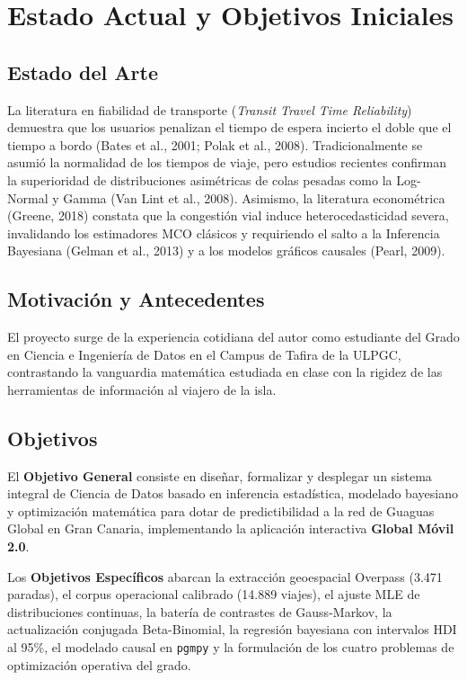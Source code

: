 \documentclass[11pt,a4paper,twoside]{report}
\begin{document}
\chapter{Estado Actual y Objetivos Iniciales}

\section{Estado del Arte}
La literatura en fiabilidad de transporte (\textit{Transit Travel Time Reliability}) demuestra que los usuarios penalizan el tiempo de espera incierto el doble que el tiempo a bordo (Bates et al., 2001; Polak et al., 2008). Tradicionalmente se asumió la normalidad de los tiempos de viaje, pero estudios recientes confirman la superioridad de distribuciones asimétricas de colas pesadas como la Log-Normal y Gamma (Van Lint et al., 2008). Asimismo, la literatura econométrica (Greene, 2018) constata que la congestión vial induce heterocedasticidad severa, invalidando los estimadores MCO clásicos y requiriendo el salto a la Inferencia Bayesiana (Gelman et al., 2013) y a los modelos gráficos causales (Pearl, 2009).

\section{Motivación y Antecedentes}
El proyecto surge de la experiencia cotidiana del autor como estudiante del Grado en Ciencia e Ingeniería de Datos en el Campus de Tafira de la ULPGC, contrastando la vanguardia matemática estudiada en clase con la rigidez de las herramientas de información al viajero de la isla.

\section{Objetivos}
El \textbf{Objetivo General} consiste en diseñar, formalizar y desplegar un sistema integral de Ciencia de Datos basado en inferencia estadística, modelado bayesiano y optimización matemática para dotar de predictibilidad a la red de Guaguas Global en Gran Canaria, implementando la aplicación interactiva \textbf{Global Móvil 2.0}.

Los \textbf{Objetivos Específicos} abarcan la extracción geoespacial Overpass (3.471 paradas), el corpus operacional calibrado (14.889 viajes), el ajuste MLE de distribuciones continuas, la batería de contrastes de Gauss-Markov, la actualización conjugada Beta-Binomial, la regresión bayesiana con intervalos HDI al 95\%, el modelado causal en \texttt{pgmpy} y la formulación de los cuatro problemas de optimización operativa del grado.
\end{document}
